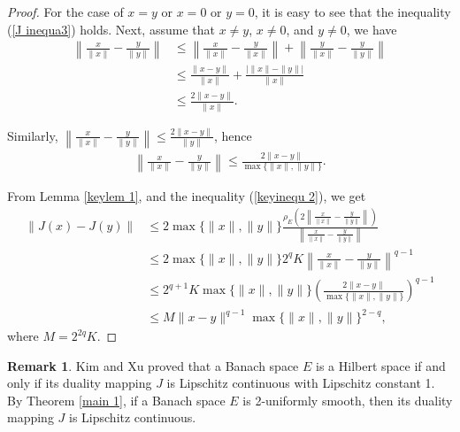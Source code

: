 \documentclass[12pt,a4paper]{amsart}
\theoremstyle{definition}
\newtheorem{definition}[theorem]{Definition}
\newtheorem{remark}{Remark}[section]
\numberwithin{equation}{section}
\begin{document}
\begin{proof}
For the case of  $x= y$ or $x= 0$ or $y= 0$, it is easy to see that the inequality (\ref{J inequa3}) holds. Next, assume that $x \neq y$, $x \neq 0$, and $y \neq 0$, we have
\begin{align*}
\left\| \frac{x}{\| x \|} - \frac{y}{\| y \|} \right\|
&\leq \left\| \frac{x}{\| x \|} - \frac{y}{\| x \|} \right\| + \left\| \frac{y}{\| x \|} - \frac{y}{\| y \|} \right\| \\
&\leq \frac{\| x - y \|}{\| x \|} + \frac{\big| \| x \| - \| y \| \big |}{\| x \|}\\
&\leq \frac{2 \| x - y \|}{\| x \|}.
\end{align*}

Similarly, \( \left\| \frac{x}{\| x \|} - \frac{y}{\| y \|} \right\| \leq \frac{2 \| x - y \|}{\| y \|} \), hence
\begin{align}\label{keyinequ 2}
   \left\| \frac{x}{\| x \|} - \frac{y}{\| y \|} \right\| \leq \frac{2 \| x - y \|}{\max\{ \| x \|, \| y \| \}}.
\end{align}

From Lemma \ref{keylem 1}, and the inequality (\ref{keyinequ 2}), we get
\begin{align*}
\| J(x) - J(y) \| &\leq 2\max\{ \| x \|, \| y \| \}  \frac{\rho_E \left( 2 \left\| \frac{x}{\| x \|} - \frac{y}{\| y \|} \right\| \right)}{\left\| \frac{x}{\| x \|} - \frac{y}{\| y \|} \right\|}\\
&\leq 2\max\{ \| x \|, \| y \| \}  2^q K  \left\| \frac{x}{\| x \|} - \frac{y}{\| y \|} \right\|^{q - 1}\\
&\leq 2^{q+1} K \max\{ \| x \|, \| y \| \}  \left( \frac{2 \| x - y \|}{\max\{ \| x \|, \| y \| \}} \right)^{q - 1}\\
&\leq M \| x - y \|^{q - 1} \max\{ \| x \|, \| y \| \}^{2 - q},
\end{align*}
where $M = 2^{2q}K$.
\end{proof}
\begin{remark}
 Kim and Xu \cite{KX} proved that a Banach space \( E \) is a Hilbert space if and only if its duality mapping \( J \) is Lipschitz continuous with Lipschitz constant 1. By Theorem \ref{main 1}, if a Banach space \( E \) is 2-uniformly smooth, then its duality mapping \( J \) is Lipschitz continuous.
\end{remark}

\end{document}
